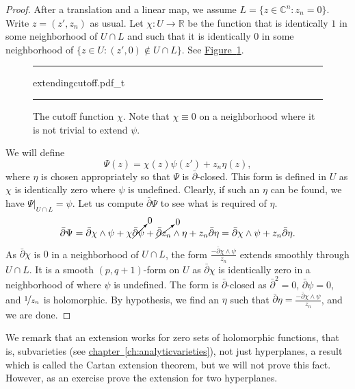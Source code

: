\documentclass[12pt,openany]{book}
\newcommand{\C}{{\mathbb{C}}}
\newcommand{\R}{{\mathbb{R}}}
\theoremstyle{plain}
\theoremstyle{remark}
\theoremstyle{definition}
\newenvironment{myfig}{%
\begin{figure}[h!t]
\noindent\rule{\textwidth}{0.5pt}\vspace{12pt}\par\centering}%
{\par\noindent\rule{\textwidth}{0.5pt}
\end{figure}}
\theoremstyle{exercise}
\theoremstyle{example}
\newcommand{\figureref}[1]{\hyperref[#1]{Figure~\ref*{#1}}}
\newcommand{\chapterref}[1]{\hyperref[#1]{chapter~\ref*{#1}}}
\begin{document}
\begin{proof}
After a translation and a linear map, we assume
$L = \{ z \in \C^n : z_n = 0 \}$.  Write $z = (z',z_n)$ as usual.
Let $\chi \colon U \to \R$ be the function that is identically $1$ in some
neighborhood of $U \cap L$ and such that it is identically $0$ in some
neighborhood of $\{ z \in U : (z',0) \notin U \cap L \}$.
See \figureref{fig:extendingcutoff}.

\begin{myfig}
{extendingcutoff.pdf_t}
\caption{The cutoff function $\chi$.
Note that $\chi \equiv 0$ on a neighborhood where it is not trivial
to extend $\psi$.\label{fig:extendingcutoff}}
\end{myfig}

We will define
\begin{equation*}
\Psi(z) = \chi(z) \psi(z') + z_n \eta(z) ,
\end{equation*}
where $\eta$ is chosen appropriately so that $\Psi$ is
$\bar{\partial}$-closed.  This form is defined in
$U$ as $\chi$ is identically zero where $\psi$ is undefined.
Clearly, if such an $\eta$ can be found,
we have $\Psi|_{U \cap L} = \psi$.
Let us compute
$\bar{\partial} \Psi$
to see what is required of $\eta$.
\begin{equation*}
\bar{\partial} \Psi =
\bar{\partial}\chi \wedge \psi
+ \chi \cancelto{0}{\bar{\partial} \psi}
 + \cancelto{0}{\bar{\partial} z_n} \wedge \eta
 + z_n \bar{\partial} \eta
=
\bar{\partial}\chi \wedge \psi
 + z_n \bar{\partial} \eta .
\end{equation*}
As $\bar{\partial} \chi$ is $0$ in a neighborhood of $U \cap L$,
the form $\frac{- \bar{\partial}\chi \wedge \psi}{z_n}$ extends smoothly
through $U \cap L$.
It is a
smooth $(p,q+1)$-form on $U$ as
$\bar{\partial}\chi$ is identically zero in a neighborhood of
where $\psi$ is undefined.
The form is
$\bar{\partial}$-closed as $\bar{\partial}^2 = 0$, $\bar{\partial}\psi = 0$,
and $\nicefrac{1}{z_n}$ is holomorphic.
By hypothesis, we find an $\eta$ such that
$\bar{\partial} \eta = \frac{- \bar{\partial}\chi \wedge \psi}{z_n}$,
and we are done.
\end{proof}

We remark that an extension works for zero sets of holomorphic functions, that
is, subvarieties
(see \chapterref{ch:analyticvarieties}), not just
hyperplanes, a result which is called the Cartan extension theorem, but we will
not prove this fact.  However, as an exercise prove the extension for
two hyperplanes.
\end{document}

